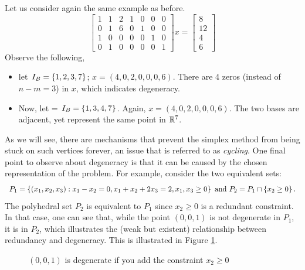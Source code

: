 Let us consider again the same example as before. 
%
\begin{equation*}
	\begin{bmatrix}
		1 & 1 & 2 & 1 & 0 & 0 & 0 \\
		0 & 1 & 6 & 0 & 1 & 0 & 0 \\
		1 & 0 & 0 & 0 & 0 & 1 & 0 \\
		0 & 1 & 0 & 0 & 0 & 0 & 1
	\end{bmatrix} 
	x =
	\begin{bmatrix}
		8  \\
		12 \\
		4  \\
		6   	
	\end{bmatrix}
\end{equation*}
%
Observe the following, 
%
\begin{itemize}
	\item let $I_B = \left\{ 1,2,3,7 \right \}$; $x = (4,0,2,0,0,0,6)$. There are 4 zeros (instead of $n-m=3$) in $x$, which indicates degeneracy. 
	\item Now, let = $I_B = \left\{ 1,3,4,7 \right \}$. Again, $x = (4,0,2,0,0,0,6)$. The two bases are adjacent, yet represent the same point in $\mathbb{R}^7$.	
\end{itemize}
%
As we will see, there are mechanisms that prevent the simplex method from being stuck on such vertices forever, an issue that is referred to as \emph{cycling}. One final point to observe about degeneracy is that it can be caused by the chosen representation of the problem. For example, consider the two equivalent sets:
%
\begin{equation*}
	P_1 = \left\{ (x_1, x_2,x_3) : x_1 - x_2 = 0, x_1 + x_2 + 2x_3 = 2, x_1, x_3 \geq 0 \right \} \text { and } P_2 = P_1 \cap \left\{ x_2 \geq 0 \right \}. 
\end{equation*}	
%
The polyhedral set $P_2$ is equivalent to $P_1$ since $x_2 \ge 0$ is a redundant constraint. In that case, one can see that, while the point $(0,0,1)$ is not degenerate in $P_1$, it is in $P_2$, which illustrates the (weak but existent) relationship between redundancy and degeneracy. This is illustrated in Figure \ref{p1c3:fig:redundancy_and_degeneration}.

\begin{figure}
    \caption{$(0,0,1)$ is degenerate if you add the constraint $x_2 \ge 0$} \label{p1c3:fig:redundancy_and_degeneration}
\end{figure}


